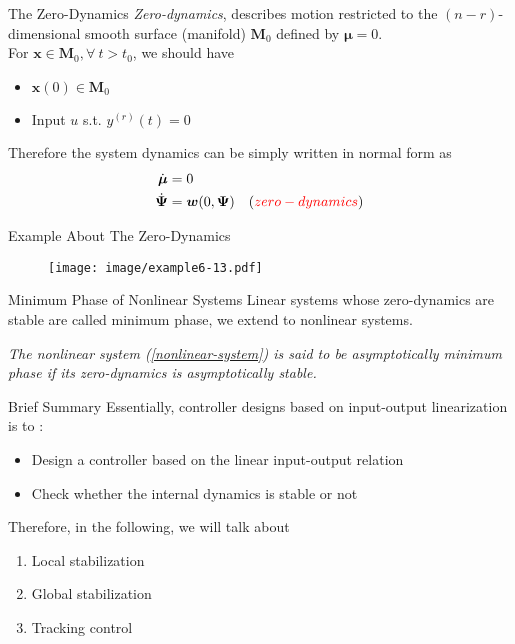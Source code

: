 \documentclass{beamer}
\renewcommand{\vec}[1]{\ensuremath{\boldsymbol{#1}}} %
\begin{document}
\begin{frame}{The Zero-Dynamics}
    \textit{{\color{red}Zero-dynamics}}, describes motion restricted to the $(n-r)$- dimensional smooth surface {\color{red}(manifold) $\vec{M}_{0}$} defined by {\color{red}$\vec{\mu}=0$}.
    \\
    For $\vec{x} \in \vec{M}_{0}, \forall~t>t_{0}$, we should have
    \begin{itemize}
      \item $\vec{x}(0) \in \vec{M}_{0}$
      \item Input $u$ s.t. $y^{(r)}(t)=0$
    \end{itemize}
    Therefore the system dynamics can be simply written in normal form as
    \begin{equation}\label{zero-normal-form}
      \begin{aligned}
        \dot{\vec{\mu}} &= 0 \\
        \dot{\vec{\Psi}}&= \vec{w}(0, \vec{\Psi})\quad ({\color{red}zero-dynamics})
      \end{aligned}
    \end{equation}
\end{frame}

\begin{frame}{Example About The Zero-Dynamics}
    \begin{figure}
      \centering
      \texttt{[image: image/example6-13.pdf]}
    \end{figure}
\end{frame}


\begin{frame}{Minimum Phase of Nonlinear Systems}
    Linear systems whose zero-dynamics are stable are called {\color{red}minimum phase}, we extend to nonlinear systems.
    \begin{definition}[6.8]
        \textit{
        The nonlinear system (\ref{nonlinear-system}) is said to be {\color{red}asymptotically minimum phase} if its zero-dynamics is asymptotically stable.
        }
    \end{definition}
\end{frame}

\begin{frame}{Brief Summary}
    Essentially, controller designs based on {\color{red}input-output linearization} is to :
    \begin{itemize}
      \item Design a controller based on the linear input-output relation
      \item Check whether the internal dynamics is stable or not
    \end{itemize}
     Therefore, in the following, we will talk about
     \begin{enumerate}
       \item Local stabilization
       \item Global stabilization
       \item Tracking control
     \end{enumerate}
\end{frame}
\end{document}
